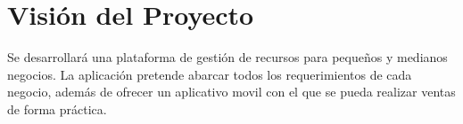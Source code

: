 \chapter{Visión del Proyecto}
Se desarrollará una plataforma de gestión de recursos para pequeños y medianos negocios. La aplicación pretende abarcar todos los requerimientos de cada negocio, además de ofrecer un aplicativo movil con el que se pueda realizar ventas de forma práctica.
